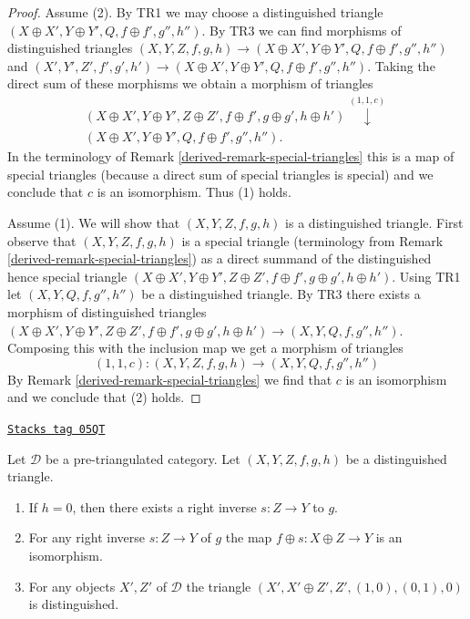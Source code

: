 \begin{proof}

Assume (2). By TR1 we may choose a distinguished triangle
$(X \oplus X', Y \oplus Y', Q, f \oplus f', g'', h'')$.
By TR3 we can find morphisms of distinguished triangles
$(X, Y, Z, f, g, h) \to
(X \oplus X', Y \oplus Y', Q, f \oplus f', g'', h'')$
and
$(X', Y', Z', f', g', h') \to
(X \oplus X', Y \oplus Y', Q, f \oplus f', g'', h'')$.
Taking the direct sum of these morphisms
we obtain a morphism of triangles
$$
\begin{array}{c}(X \oplus X', Y \oplus Y', Z \oplus Z',
f \oplus f', g \oplus g', h \oplus h')
\overset{(1, 1, c)}{\downarrow} \\ (X \oplus X', Y \oplus Y', Q, f \oplus f', g'', h'').\end{array}
$$
In the terminology of Remark \ref{derived-remark-special-triangles}
this is a map of special triangles (because a direct sum of special
triangles is special) and we conclude
that $c$ is an isomorphism. Thus (1) holds.

\medskip\noindent
Assume (1). We will show that $(X, Y, Z, f, g, h)$ is a distinguished
triangle. First observe that $(X, Y, Z, f, g, h)$ is a special triangle
(terminology from Remark \ref{derived-remark-special-triangles})
as a direct summand of the distinguished hence special
triangle $(X \oplus X', Y \oplus Y', Z \oplus Z',
f \oplus f', g \oplus g', h \oplus h')$. Using TR1 let
$(X, Y, Q, f, g'', h'')$ be a distinguished triangle. By TR3 there exists
a morphism of distinguished triangles
 $(X \oplus X', Y \oplus Y', Z \oplus Z',
f \oplus f', g \oplus g', h \oplus h') \to (X, Y, Q, f, g'', h'')$.
Composing this with the inclusion map we get a morphism of triangles
$$
(1, 1, c) :
(X, Y, Z, f, g, h)
\longrightarrow
(X, Y, Q, f, g'', h'')
$$
By Remark \ref{derived-remark-special-triangles}
we find that $c$ is an isomorphism and we conclude
that (2) holds.
\end{proof}

\begin{lemma}[Split]
\label{derived-lemma-split}
\href{https://stacks.math.columbia.edu/tag/05QT}{\texttt{Stacks tag 05QT}}

Let $\mathcal{D}$ be a pre-triangulated category.
Let $(X, Y, Z, f, g, h)$ be a distinguished triangle.
\begin{enumerate}
\item If $h = 0$, then there exists a right inverse $s : Z \to Y$ to $g$.
\item For any right inverse $s : Z \to Y$ of $g$ the map
$f \oplus s : X \oplus Z \to Y$ is an isomorphism.
\item For any objects $X', Z'$ of $\mathcal{D}$ the triangle
$(X', X' \oplus Z', Z', (1, 0), (0, 1), 0)$ is distinguished.
\end{enumerate}
\end{lemma}

